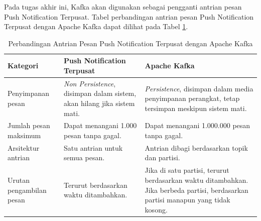 \par Pada tugas akhir ini, Kafka akan digunakan sebagai pengganti antrian pesan Push Notification Terpusat. Tabel perbandingan antrian pesan Push Notification Terpusat dengan Apache Kafka dapat dilihat pada Tabel \ref{t:perbandingan_kafka}.
\begin{longtable}{|p{2.5cm}|p{3.5cm}|p{3.5cm}|}
	\caption{Perbandingan Antrian Pesan Push Notification Terpusat dengan Apache Kafka} \label{t:perbandingan_kafka} \\ \hline
	\rowcolor{lightgray} Kategori & Push Notification Terpusat & Apache Kafka \\ \hline
	\endhead
	Penyimpanan pesan & \textit{Non Persistence}, disimpan dalam sistem, akan hilang jika sistem mati. & \textit{Persistence}, disimpan dalam media penyimpanan perangkat, tetap tersimpan meskipun sistem mati. \\ \hline
	Jumlah pesan maksimum & Dapat menangani 1.000 pesan tanpa gagal. & Dapat menangani 1.000.000 pesan tanpa gagal. \\ \hline
	Arsitektur antrian & Satu antrian untuk semua pesan. & Antrian dibagi berdasarkan topik dan partisi. \\ \hline
	Urutan pengambilan pesan & Terurut berdasarkan waktu ditambahkan. & Jika di satu partisi, terurut berdasarkan waktu ditambahkan. Jika berbeda partisi, berdasarkan partisi manapun yang tidak kosong. \\ \hline
\end{longtable}



